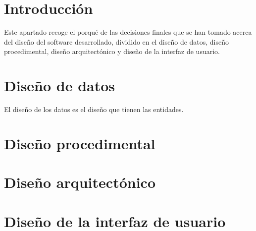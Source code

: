 
\section{Introducción}
Este apartado recoge el porqué de las decisiones finales que se han tomado acerca del diseño del software desarrollado, dividido en el diseño de datos, diseño procedimental, diseño arquitectónico y diseño de la interfaz de usuario.
\section{Diseño de datos}
El diseño de los datos es el diseño que tienen las entidades.
\section{Diseño procedimental}

\section{Diseño arquitectónico}

\section{Diseño de la interfaz de usuario}
